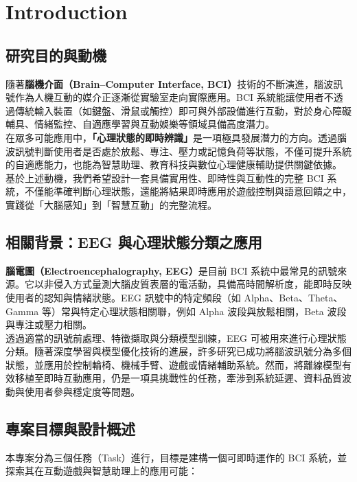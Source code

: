 \section{Introduction}\label{sec:introduction}
\subsection{研究目的與動機}
隨著\textbf{腦機介面（Brain–Computer Interface, BCI）}技術的不斷演進，腦波訊號作為人機互動的媒介正逐漸從實驗室走向實際應用。BCI 系統能讓使用者不透過傳統輸入裝置（如鍵盤、滑鼠或觸控）即可與外部設備進行互動，對於身心障礙輔具、情緒監控、自適應學習與互動娛樂等領域具備高度潛力。\\

在眾多可能應用中，\textbf{「心理狀態的即時辨識」}是一項極具發展潛力的方向。透過腦波訊號判斷使用者是否處於放鬆、專注、壓力或記憶負荷等狀態，不僅可提升系統的自適應能力，也能為智慧助理、教育科技與數位心理健康輔助提供關鍵依據。\\

基於上述動機，我們希望設計一套具備實用性、即時性與互動性的完整 BCI 系統，不僅能準確判斷心理狀態，還能將結果即時應用於遊戲控制與語意回饋之中，實踐從「大腦感知」到「智慧互動」的完整流程。

\subsection{相關背景：EEG 與心理狀態分類之應用}
\textbf{腦電圖（Electroencephalography, EEG）}是目前 BCI 系統中最常見的訊號來源。它以非侵入方式量測大腦皮質表層的電活動，具備高時間解析度，能即時反映使用者的認知與情緒狀態。EEG 訊號中的特定頻段（如 Alpha、Beta、Theta、Gamma 等）常與特定心理狀態相關聯，例如 Alpha 波段與放鬆相關，Beta 波段與專注或壓力相關。 \\

透過適當的訊號前處理、特徵擷取與分類模型訓練，EEG 可被用來進行心理狀態分類。隨著深度學習與模型優化技術的進展，許多研究已成功將腦波訊號分為多個狀態，並應用於控制輪椅、機械手臂、遊戲或情緒輔助系統。然而，將離線模型有效移植至即時互動應用，仍是一項具挑戰性的任務，牽涉到系統延遲、資料品質波動與使用者參與穩定度等問題。

\subsection{專案目標與設計概述}
本專案分為三個任務（Task）進行，目標是建構一個可即時運作的 BCI 系統，並探索其在互動遊戲與智慧助理上的應用可能：

